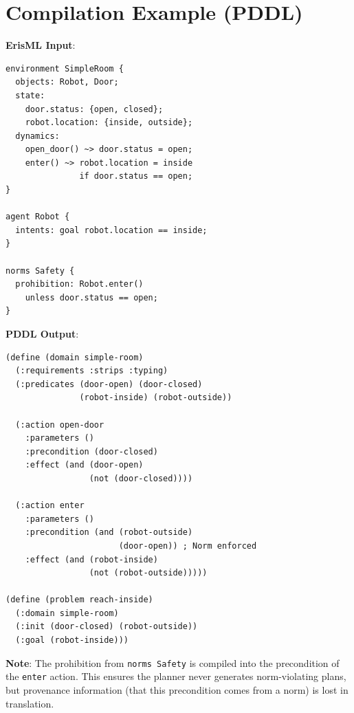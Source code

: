 \documentclass[conference]{IEEEtran}
\begin{document}
\section{Compilation Example (PDDL)}
\label{app:pddl}

\textbf{ErisML Input}:

\begin{lstlisting}
environment SimpleRoom {
  objects: Robot, Door;
  state:
    door.status: {open, closed};
    robot.location: {inside, outside};
  dynamics:
    open_door() ~> door.status = open;
    enter() ~> robot.location = inside
               if door.status == open;
}

agent Robot {
  intents: goal robot.location == inside;
}

norms Safety {
  prohibition: Robot.enter()
    unless door.status == open;
}
\end{lstlisting}

\textbf{PDDL Output}:

\begin{lstlisting}
(define (domain simple-room)
  (:requirements :strips :typing)
  (:predicates (door-open) (door-closed)
               (robot-inside) (robot-outside))

  (:action open-door
    :parameters ()
    :precondition (door-closed)
    :effect (and (door-open)
                 (not (door-closed))))

  (:action enter
    :parameters ()
    :precondition (and (robot-outside)
                       (door-open)) ; Norm enforced
    :effect (and (robot-inside)
                 (not (robot-outside)))))

(define (problem reach-inside)
  (:domain simple-room)
  (:init (door-closed) (robot-outside))
  (:goal (robot-inside)))
\end{lstlisting}

\textbf{Note}: The prohibition from \texttt{norms Safety} is compiled
into the precondition of the \texttt{enter} action. This ensures the
planner never generates norm-violating plans, but provenance information
(that this precondition comes from a norm) is lost in translation.
\end{document}
